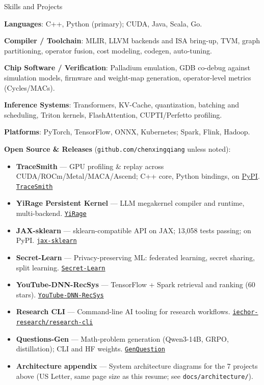 \documentclass{resume} %
\newcommand{\repo}[2]{\href{#2}{\small\nolinkurl{#1}}}
\begin{document}
\begin{rSection}{Skills and Projects}

 \item {\bf Languages}: C++, Python (primary); CUDA, Java, Scala, Go.

 \item {\bf Compiler / Toolchain}: MLIR, LLVM backends and ISA bring-up, TVM, graph partitioning, operator fusion, cost modeling, codegen, auto-tuning.

 \item {\bf Chip Software / Verification}: Palladium emulation, GDB co-debug against simulation models, firmware and weight-map generation, operator-level metrics (Cycles/MACs).

 \item {\bf Inference Systems}: Transformers, KV-Cache, quantization, batching and scheduling, Triton kernels, FlashAttention, CUPTI/Perfetto profiling.

 \item {\bf Platforms}: PyTorch, TensorFlow, ONNX, Kubernetes; Spark, Flink, Hadoop.

\item{\bf Open Source \& Releases} (\nolinkurl{github.com/chenxingqiang} unless noted):

\begin{itemize}
  \item {\bf TraceSmith} — GPU profiling \& replay across CUDA/ROCm/Metal/MACA/Ascend; C++ core, Python bindings, on \href{https://pypi.org/project/tracesmith/}{PyPI}. \repo{TraceSmith}{https://github.com/chenxingqiang/TraceSmith}
  \item {\bf YiRage Persistent Kernel} — LLM megakernel compiler and runtime, multi-backend. \repo{YiRage}{https://github.com/chenxingqiang/YiRage}
  \item {\bf JAX-sklearn} — sklearn-compatible API on JAX; 13{,}058 tests passing; on PyPI. \repo{jax-sklearn}{https://github.com/chenxingqiang/jax-sklearn}
  \item {\bf Secret-Learn} — Privacy-preserving ML: federated learning, secret sharing, split learning. \repo{Secret-Learn}{https://github.com/chenxingqiang/Secret-Learn}
  \item {\bf YouTube-DNN-RecSys} — TensorFlow + Spark retrieval and ranking (60 stars). \repo{YouTube-DNN-RecSys}{https://github.com/chenxingqiang/YouTube-DNN-RecSys}
  \item {\bf Research CLI} — Command-line AI tooling for research workflows. \repo{iechor-research/research-cli}{https://github.com/iechor-research/research-cli}
  \item {\bf Questions-Gen} — Math-problem generation (Qwen3-14B, GRPO, distillation); CLI and HF weights. \repo{GenQuestion}{https://github.com/chenxingqiang/GenQuestion}
  \item {{\bf Architecture appendix}} — System architecture diagrams for the 7 projects above (US Letter, same page size as this resume; see \nolinkurl{docs/architecture/}).
\end{itemize}

\end{rSection}
\end{document}
